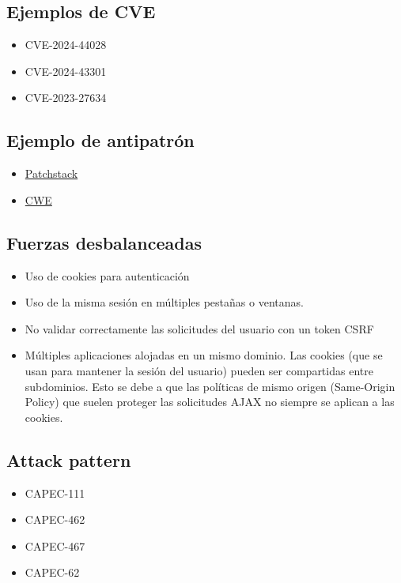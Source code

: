 \subsection*{Ejemplos de CVE}
\begin{itemize}
    \item CVE-2024-44028
    \item CVE-2024-43301
    \item CVE-2023-27634
\end{itemize}

\subsection*{Ejemplo de antipatrón} 

\begin{itemize}
    \item \href{https://patchstack.com/academy/wordpress/vulnerabilities/cross-site-request-forgery/}{Patchstack}
    \item \href{https://cwe.mitre.org/data/definitions/352.html}{CWE}
\end{itemize}

\subsection*{Fuerzas desbalanceadas} \begin{itemize} \item Uso de cookies para autenticación \item Uso de la misma sesión en múltiples pestañas o ventanas. \item No validar correctamente las solicitudes del usuario con un token CSRF \item Múltiples aplicaciones alojadas en un mismo dominio. Las cookies (que se usan para mantener la sesión del usuario) pueden ser compartidas entre subdominios. Esto se debe a que las políticas de mismo origen (Same-Origin Policy) que suelen proteger las solicitudes AJAX no siempre se aplican a las cookies. \end{itemize}

\subsection*{Attack pattern} 
\begin{itemize}
    \item CAPEC-111
    \item CAPEC-462
    \item CAPEC-467
    \item CAPEC-62
\end{itemize}

